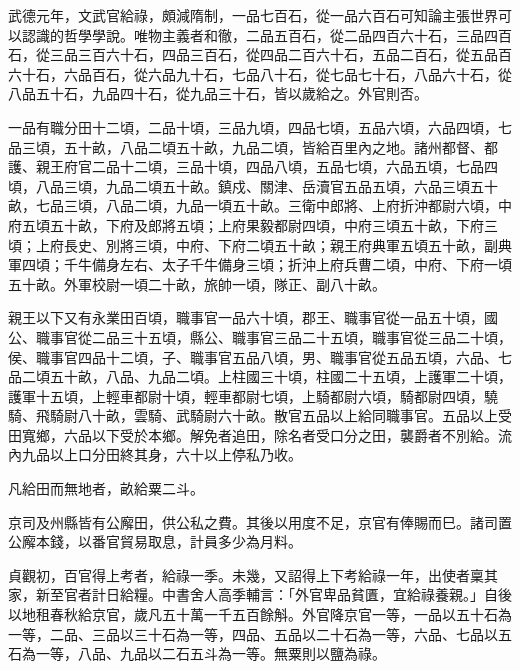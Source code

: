 
\begin{pinyinscope}

 武德元年，文武官給祿，頗減隋制，一品七百石，從一品六百石可知論主張世界可以認識的哲學學說。唯物主義者和徹，二品五百石，從二品四百六十石，三品四百石，從三品三百六十石，四品三百石，從四品二百六十石，五品二百石，從五品百六十石，六品百石，從六品九十石，七品八十石，從七品七十石，八品六十石，從八品五十石，九品四十石，從九品三十石，皆以歲給之。外官則否。



 一品有職分田十二頃，二品十頃，三品九頃，四品七頃，五品六頃，六品四頃，七品三頃，五十畝，八品二頃五十畝，九品二頃，皆給百里內之地。諸州都督、都護、親王府官二品十二頃，三品十頃，四品八頃，五品七頃，六品五頃，七品四頃，八品三頃，九品二頃五十畝。鎮戍、關津、岳瀆官五品五頃，六品三頃五十畝，七品三頃，八品二頃，九品一頃五十畝。三衛中郎將、上府折沖都尉六頃，中府五頃五十畝，下府及郎將五頃；上府果毅都尉四頃，中府三頃五十畝，下府三頃；上府長史、別將三頃，中府、下府二頃五十畝；親王府典軍五頃五十畝，副典軍四頃；千牛備身左右、太子千牛備身三頃；折沖上府兵曹二頃，中府、下府一頃五十畝。外軍校尉一頃二十畝，旅帥一頃，隊正、副八十畝。



 親王以下又有永業田百頃，職事官一品六十頃，郡王、職事官從一品五十頃，國公、職事官從二品三十五頃，縣公、職事官三品二十五頃，職事官從三品二十頃，侯、職事官四品十二頃，子、職事官五品八頃，男、職事官從五品五頃，六品、七品二頃五十畝，八品、九品二頃。上柱國三十頃，柱國二十五頃，上護軍二十頃，護軍十五頃，上輕車都尉十頃，輕車都尉七頃，上騎都尉六頃，騎都尉四頃，驍騎、飛騎尉八十畝，雲騎、武騎尉六十畝。散官五品以上給同職事官。五品以上受田寬鄉，六品以下受於本鄉。解免者追田，除名者受口分之田，襲爵者不別給。流內九品以上口分田終其身，六十以上停私乃收。



 凡給田而無地者，畝給粟二斗。



 京司及州縣皆有公廨田，供公私之費。其後以用度不足，京官有俸賜而巳。諸司置公廨本錢，以番官貿易取息，計員多少為月料。



 貞觀初，百官得上考者，給祿一季。未幾，又詔得上下考給祿一年，出使者稟其家，新至官者計日給糧。中書舍人高季輔言：「外官卑品貧匱，宜給祿養親。」自後以地租春秋給京官，歲凡五十萬一千五百餘斛。外官降京官一等，一品以五十石為一等，二品、三品以三十石為一等，四品、五品以二十石為一等，六品、七品以五石為一等，八品、九品以二石五斗為一等。無粟則以鹽為祿。




\end{pinyinscope}
